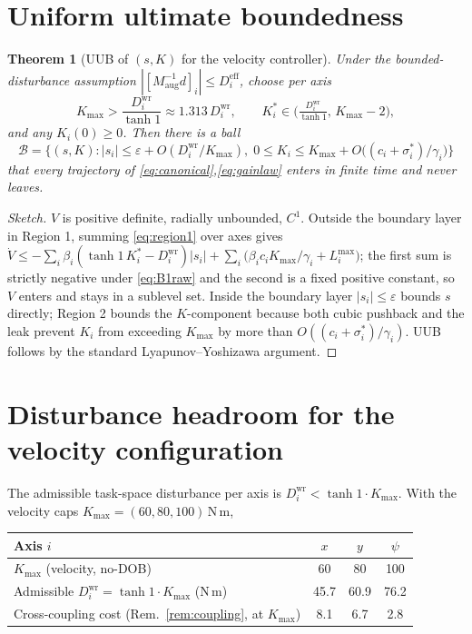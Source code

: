 \documentclass[11pt]{article}
\theoremstyle{plain}
\newtheorem{theorem}{Theorem}
\theoremstyle{definition}
\newcommand{\Maug}{M_{\mathrm{aug}}}
\newcommand{\Deff}{D^{\mathrm{eff}}}
\newcommand{\Dwr}{D^{\mathrm{wr}}}
\newcommand{\Kmax}{K_{\max}}
\begin{document}
\section{Uniform ultimate boundedness}
\label{sec:uub}
\begin{theorem}[UUB of $(s,K)$ for the velocity controller]
Under the bounded-disturbance assumption $|[\Maug^{-1}d]_i|\le\Deff_i$, choose per axis
\begin{equation}
\Kmax>\frac{\Dwr_i}{\tanh1}\approx1.313\,\Dwr_i,
\qquad
K_i^*\in\Big(\tfrac{\Dwr_i}{\tanh1},\,\Kmax-2\Big),
\end{equation}
and any $K_i(0)\ge0$. Then there is a ball
\[
\mathcal{B}=\Big\{(s,K):|s_i|\le\varepsilon+O(\Dwr_i/\Kmax),\;
0\le K_i\le\Kmax+O\big((c_i+\sigma^{\!*}_i)/\gamma_i\big)\Big\}
\]
that every trajectory of \eqref{eq:canonical},\eqref{eq:gainlaw} enters in finite time
and never leaves.
\end{theorem}
\begin{proof}[Sketch]
$V$ is positive definite, radially unbounded, $C^1$. Outside the boundary layer in
Region 1, summing \eqref{eq:region1} over axes gives
$\dot V\le-\sum_i\beta_i(\tanh1\,K_i^*-\Dwr_i)|s_i|+\sum_i\big(\beta_ic_i\Kmax/\gamma_i
+L_i^{\max}\big)$; the first sum is strictly negative under \eqref{eq:B1raw} and the
second is a fixed positive constant, so $V$ enters and stays in a sublevel set. Inside
the boundary layer $|s_i|\le\varepsilon$ bounds $s$ directly; Region 2 bounds the
$K$-component because both cubic pushback and the leak prevent $K_i$ from exceeding
$\Kmax$ by more than $O((c_i+\sigma^{\!*}_i)/\gamma_i)$. UUB follows by the standard
Lyapunov--Yoshizawa argument.
\end{proof}

\section{Disturbance headroom for the velocity configuration}
\label{sec:headroom}
The admissible task-space disturbance per axis is $\Dwr_i<\tanh1\cdot\Kmax$. With the
velocity caps $\Kmax=(60,80,100)\,$N\,m,
\begin{center}
\begin{tabular}{lccc}
\toprule
Axis $i$ & $x$ & $y$ & $\psi$\\
\midrule
$\Kmax$ (velocity, no-DOB) & 60 & 80 & 100\\
Admissible $\Dwr_i=\tanh1\cdot\Kmax$ (N\,m) & 45.7 & 60.9 & 76.2\\
Cross-coupling cost (Rem.~\ref{rem:coupling}, at $\Kmax$) & 8.1 & 6.7 & 2.8\\
\bottomrule
\end{tabular}
\end{center}
\end{document}
